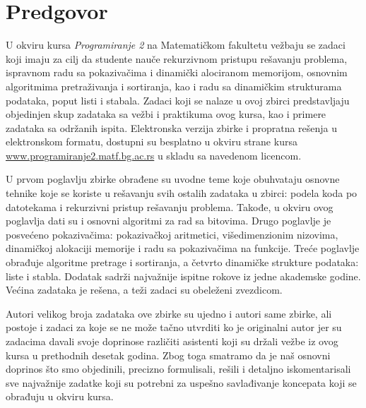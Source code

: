 
\chapter*{Predgovor}

U okviru kursa {\em Programiranje 2} na Matematičkom fakultetu vežbaju se zadaci 
koji imaju za cilj da studente nauče rekurzivnom pristupu rešavanju problema, 
ispravnom radu sa pokazivačima i dinamički alociranom memorijom, osnovnim algoritmima 
pretraživanja i sortiranja, kao i radu sa dinamičkim strukturama podataka, 
poput listi i stabala. Zadaci koji se nalaze u ovoj zbirci predstavljaju 
objedinjen skup zadataka sa vežbi i praktikuma ovog kursa, kao i primere 
zadataka sa održanih ispita. 
Elektronska verzija zbirke i propratna rešenja u elektronskom formatu, dostupni su 
besplatno u okviru strane kursa \url{www.programiranje2.matf.bg.ac.rs} u skladu sa navedenom licencom.


U prvom poglavlju zbirke obrađene su uvodne teme koje obuhvataju osnovne tehnike koje se koriste u rešavanju svih ostalih zadataka u zbirci: podela koda po datotekama i rekurzivni pristup rešavanju problema. Takođe, u okviru ovog poglavlja dati su i osnovni algoritmi za rad sa bitovima. Drugo poglavlje je posvećeno pokazivačima: pokazivačkoj aritmetici, višedimenzionim nizovima, dinamičkoj alokaciji memorije i radu sa pokazivačima na funkcije. Treće poglavlje obrađuje algoritme pretrage i sortiranja, a četvrto dinamičke strukture podataka: liste i stabla. Dodatak sadrži najvažnije ispitne rokove iz jedne akademske godine. Većina zadataka je rešena, a teži zadaci su obeleženi zvezdicom.


Autori velikog broja zadataka ove zbirke su ujedno i autori same zbirke, ali postoje 
i zadaci za koje se ne može tačno utvrditi ko je originalni autor jer su zadacima 
davali svoje doprinose različiti asistenti koji su držali vežbe iz ovog kursa u 
prethodnih desetak godina. Zbog toga smatramo da je naš osnovni doprinos 
što smo objedinili, precizno formulisali, rešili i detaljno iskomentarisali 
sve najvažnije zadatke koji su potrebni za uspešno savlađivanje koncepata 
koji se obrađuju u okviru kursa. 


